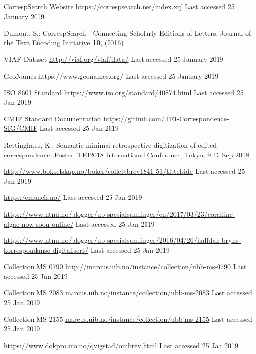\documentclass[runningheads]{llncs}
\begin{document}
\begin{thebibliography}{8}

CorrespSearch Website \url{https://correspsearch.net/index.xql}
Last accessed 25 January 2019

Dumont, S.: CorrespSearch - Connecting Scholarly Editions of Letters. Journal of the Text Encoding Initiative \textbf{10}, (2016)

VIAF Dataset \url{http://viaf.org/viaf/data/}
Last accessed 25 January 2019

GeoNames \url{https://www.geonames.org/}
Last accessed 25 January 2019

ISO 8601 Standard \url{https://www.iso.org/standard/40874.html}
Last accessed 25 Jan 2019

CMIF Standard Documentation \url{https://github.com/TEI-Correspondence-SIG/CMIF}
Last accessed 25 Jan 2019

Rettinghaus, K.: Semantic minimal retrospective digitization of edited correspondence. Poster. TEI2018 International Conference, Tokyo, 9-13 Sep 2018

\url{http://www.bokselskap.no/boker/collettbrev1841-51/tittelside}
Last accessed 25 Jan 2019

\url{https:/emunch.no/}
Last accessed 25 Jan 2019

\url{https://www.ntnu.no/blogger/ub-spesialsamlinger/en/2017/03/23/coralline-algae-now-soon-online/}
Last accessed 25 Jan 2019

\url{https://www.ntnu.no/blogger/ub-spesialsamlinger/2016/04/26/halfdan-bryns-korrespondanse-digitalisert/}
Last accessed 25 Jan 2019

Collection MS 0790 \url{http://marcus.uib.no/instance/collection/ubb-ms-0790}
Last accessed 25 Jan 2019

Collection MS 2083 \url{marcus.uib.no/instance/collection/ubb-ms-2083}
Last accessed 25 Jan 2019

Collection MS 2155 \url{marcus.uib.no/instance/collection/ubb-ms-2155}
Last accessed 25 Jan 2019

\url{https://www.dokpro.uio.no/qvigstad/ombrev.html}
Last accessed 25 Jan 2019

\end{thebibliography}
\end{document}
